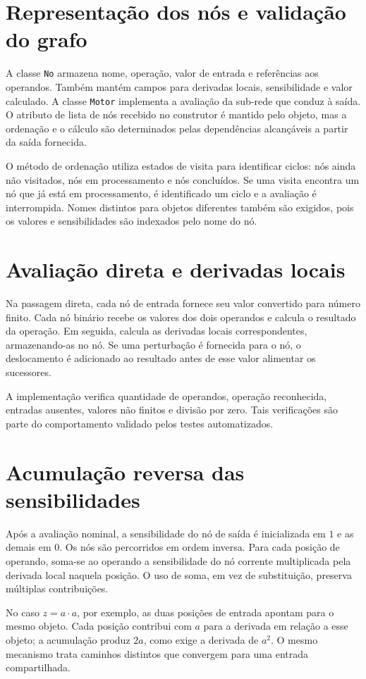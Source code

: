 \documentclass[12pt,openright,oneside,a4paper,brazil]{abntex2}
\begin{document}
\section{Representação dos nós e validação do grafo}
A classe \texttt{No} armazena nome, operação, valor de entrada e referências aos operandos. Também mantém campos para derivadas locais, sensibilidade e valor calculado. A classe \texttt{Motor} implementa a avaliação da sub-rede que conduz à saída. O atributo de lista de nós recebido no construtor é mantido pelo objeto, mas a ordenação e o cálculo são determinados pelas dependências alcançáveis a partir da saída fornecida.

O método de ordenação utiliza estados de visita para identificar ciclos: nós ainda não visitados, nós em processamento e nós concluídos. Se uma visita encontra um nó que já está em processamento, é identificado um ciclo e a avaliação é interrompida. Nomes distintos para objetos diferentes também são exigidos, pois os valores e sensibilidades são indexados pelo nome do nó.

\section{Avaliação direta e derivadas locais}
Na passagem direta, cada nó de entrada fornece seu valor convertido para número finito. Cada nó binário recebe os valores dos dois operandos e calcula o resultado da operação. Em seguida, calcula as derivadas locais correspondentes, armazenando-as no nó. Se uma perturbação é fornecida para o nó, o deslocamento é adicionado ao resultado antes de esse valor alimentar os sucessores.

A implementação verifica quantidade de operandos, operação reconhecida, entradas ausentes, valores não finitos e divisão por zero. Tais verificações são parte do comportamento validado pelos testes automatizados.

\section{Acumulação reversa das sensibilidades}
Após a avaliação nominal, a sensibilidade do nó de saída é inicializada em $1$ e as demais em $0$. Os nós são percorridos em ordem inversa. Para cada posição de operando, soma-se ao operando a sensibilidade do nó corrente multiplicada pela derivada local naquela posição. O uso de soma, em vez de substituição, preserva múltiplas contribuições.

No caso $z=a\cdot a$, por exemplo, as duas posições de entrada apontam para o mesmo objeto. Cada posição contribui com $a$ para a derivada em relação a esse objeto; a acumulação produz $2a$, como exige a derivada de $a^2$. O mesmo mecanismo trata caminhos distintos que convergem para uma entrada compartilhada.
\end{document}
